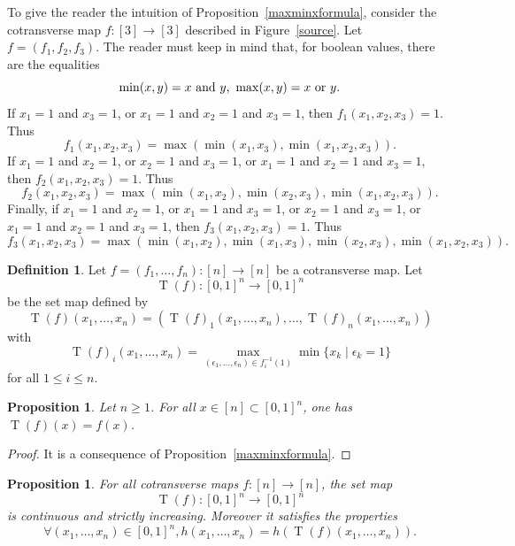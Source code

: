 \documentclass[a4paper,12pt]{amsart}
\newtheorem{prop}[thm]{Proposition}
\newcommand{\bp}{\begin{prop}}
\newcommand{\ep}{\end{prop}}
\newcommand{\bpf}{\begin{proof}}
\newcommand{\epf}{\end{proof}}
\theoremstyle{definition}
\newtheorem{defn}[thm]{Definition}
\newcommand{\bd}{\begin{defn}}
\newcommand{\ed}{\end{defn}}
\renewcommand{\leq}{\leqslant}
\renewcommand{\geq}{\geqslant}
\DeclareMathOperator{\TT}{T}
\begin{document}
To give the reader the intuition of Proposition~\ref{maxminxformula}, consider the cotransverse map $f:[3]\to [3]$ described in Figure~\ref{source}. Let $f=(f_1,f_2,f_3)$. The reader must keep in mind that, for boolean values, there are the equalities 
\[
\min(x,y) = x\hbox{ and }y \hbox{, }\max(x,y) = x\hbox{ or }y.
\]
If $x_1=1$ and $x_3=1$, or $x_1=1$ and $x_2=1$ and $x_3=1$, then $f_1(x_1,x_2,x_3)=1$. Thus \[f_1(x_1,x_2,x_3)=\max(\min(x_1,x_3),\min(x_1,x_2,x_3)).\] If $x_1=1$ and $x_2=1$, or $x_2=1$ and $x_3=1$, or $x_1=1$ and $x_2=1$ and $x_3=1$, then $f_2(x_1,x_2,x_3)=1$. Thus \[f_2(x_1,x_2,x_3)=\max(\min(x_1,x_2),\min(x_2,x_3),\min(x_1,x_2,x_3)).\] Finally, if $x_1=1$ and $x_2=1$, or $x_1=1$ and $x_3=1$, or $x_2=1$ and $x_3=1$, or $x_1=1$ and $x_2=1$ and $x_3=1$, then $f_3(x_1,x_2,x_3)=1$. Thus \[f_3(x_1,x_2,x_3)=\max(\min(x_1,x_2),\min(x_1,x_3),\min(x_2,x_3),\min(x_1,x_2,x_3)).\]


\bd \label{topologize1}
	Let $f=(f_1,\dots,f_n):[n]\to [n]$ be a cotransverse map. Let \[\TT(f):[0,1]^n\to [0,1]^n\] be the set map defined by 
	\[
	\TT(f)(x_1,\dots,x_n) = (\TT(f)_1(x_1,\dots,x_n),\dots,\TT(f)_n(x_1,\dots,x_n))
	\]
	with \[\TT(f)_i(x_1,\dots,x_n) = \max_{(\epsilon_1,\dots,\epsilon_n)\in f_i^{-1}(1)} \min \{x_k\mid \epsilon_k=1\}\] for all $1\leq i\leq n$.
\ed

\bp \label{restrictionf}
Let $n\geq 1$. For all $x\in [n]\subset [0,1]^n$, one has $\TT(f)(x)=f(x)$.
\ep

\bpf
It is a consequence of Proposition~\ref{maxminxformula}.
\epf

\bp \label{preserv-h-cont}
For all cotransverse maps $f:[n]\to [n]$, the set map \[\TT(f):[0,1]^n\longrightarrow [0,1]^n\] is continuous and strictly increasing. Moreover it satisfies the properties 
\[\forall (x_1,\dots,x_n)\in [0,1]^n, h(x_1,\dots,x_n) = h(\TT(f)(x_1,\dots,x_n)).\]
\ep
\end{document}
